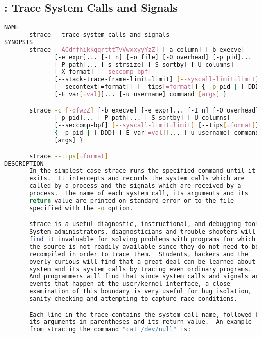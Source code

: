 % 
\subsection{: Trace System Calls and Signals}

{\tiny{
\begin{lstlisting}[language=bash]
NAME
       strace - trace system calls and signals
SYNOPSIS
       strace [-ACdffhikkqqrtttTvVwxxyyYzZ] [-a column] [-b execve]
              [-e expr]... [-I n] [-o file] [-O overhead] [-p pid]...
              [-P path]... [-s strsize] [-S sortby] [-U columns]
              [-X format] [--seccomp-bpf]
              [--stack-trace-frame-limit=limit] [--syscall-limit=limit]
              [--secontext[=format]] [--tips[=format]] { -p pid | [-DDD]
              [-E var[=val]]... [-u username] command [args] }

       strace -c [-dfwzZ] [-b execve] [-e expr]... [-I n] [-O overhead]
              [-p pid]... [-P path]... [-S sortby] [-U columns]
              [--seccomp-bpf] [--syscall-limit=limit] [--tips[=format]]
              { -p pid | [-DDD] [-E var[=val]]... [-u username] command
              [args] }

       strace --tips[=format]
DESCRIPTION
       In the simplest case strace runs the specified command until it
       exits.  It intercepts and records the system calls which are
       called by a process and the signals which are received by a
       process.  The name of each system call, its arguments and its
       return value are printed on standard error or to the file
       specified with the -o option.

       strace is a useful diagnostic, instructional, and debugging tool.
       System administrators, diagnosticians and trouble-shooters will
       find it invaluable for solving problems with programs for which
       the source is not readily available since they do not need to be
       recompiled in order to trace them.  Students, hackers and the
       overly-curious will find that a great deal can be learned about a
       system and its system calls by tracing even ordinary programs.
       And programmers will find that since system calls and signals are
       events that happen at the user/kernel interface, a close
       examination of this boundary is very useful for bug isolation,
       sanity checking and attempting to capture race conditions.

       Each line in the trace contains the system call name, followed by
       its arguments in parentheses and its return value.  An example
       from stracing the command "cat /dev/null" is:


\end{lstlisting}}}
